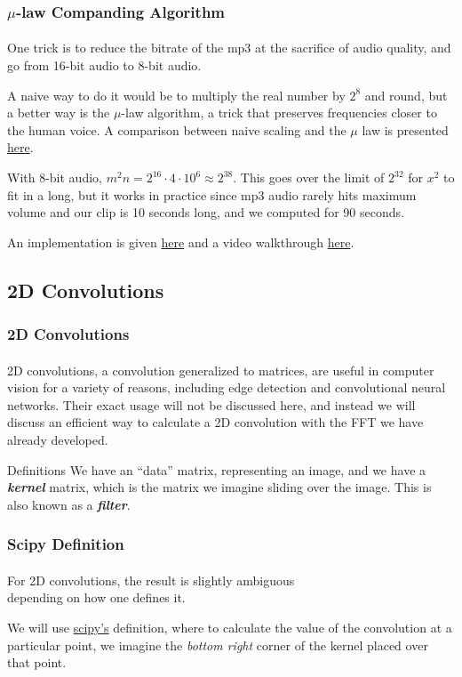 \documentclass[11pt,handout]{beamer}             %
\newcommand{\emphasis}[1]{\textbf{\textit{#1}}}
\begin{document}
\begin{frame}
\frametitle{\( \mu \)-law Companding Algorithm}
\framesubtitle{}
One trick is to reduce the bitrate of the mp3 at the sacrifice of audio quality,
and go from 16-bit audio to 8-bit audio. \pause

A naive way to do it would be to multiply the real number by \( 2^8 \) and
round, but a better way is the \( \mu \)-law algorithm, a trick that preserves
frequencies closer to the human voice. A comparison between naive scaling
and the \( \mu \) law is presented
\href{https://www.youtube.com/watch?v=PqkE_t5cCoA}{here}. \pause

With 8-bit audio, \( m^2 n = 2^{16} \cdot 4 \cdot 10^6 \approx 2^{38} \).
This goes over the limit of \( 2^{32} \) for \( x^2 \) to fit in a long,
but it works in practice since mp3 audio rarely hits maximum volume and
our clip is 10 seconds long, and we computed for 90 seconds. \pause

An implementation is given
\href{https://github.com/stephen-huan/anime-music-quiz}{here} and a video
walkthrough \href{https://www.youtube.com/watch?v=7fUicc_lIGA}{here}.
\end{frame}

\subsection{2D Convolutions}
\begin{frame}
\frametitle{2D Convolutions}
\framesubtitle{}
2D convolutions, a convolution generalized to matrices, are useful in computer
vision for a variety of reasons, including edge detection and convolutional
neural networks. Their exact usage will not be discussed here, and instead
we will discuss an efficient way to calculate a 2D convolution with the FFT we 
have already developed. 

\begin{alertblock}{Definitions}
  We have an \enquote{data} matrix, representing an image,
  and we have a \emphasis{kernel} matrix, which is the matrix we imagine
  sliding over the image. This is also known as a \emphasis{filter}.
\end{alertblock}
\end{frame}

\begin{frame}
\frametitle{Scipy Definition}
\framesubtitle{}
For 2D convolutions, the result is slightly ambiguous \\
depending on how one defines it. 

We will use
\href{https://docs.scipy.org/doc/scipy/reference/generated/scipy.signal.convolve2d.html}{scipy's}
definition, where to calculate the value of the convolution at a particular
point, we imagine the \textit{bottom right} corner of the kernel
placed over that point.
\end{frame}
\end{document}
